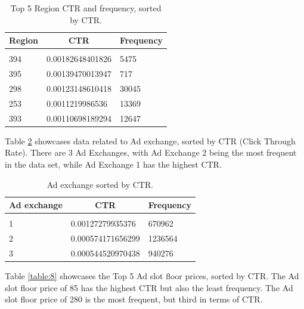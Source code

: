 \documentclass{article} %
\begin{document}
\begin{table}[!htbp]
\caption{Top 5 Region CTR and frequency, sorted by CTR.}
\label{table:6}
\begin{center}
\begin{tabular}{l l l}
\multicolumn{1}{c}{\bf Region} & \multicolumn{1}{c}{\bf CTR} & \multicolumn{1}{c}{\bf Frequency}
\\ \hline \\
394 & 0.00182648401826 & 5475\\
395 & 0.00139470013947 & 717\\
298 & 0.00123148610418 & 30045\\
253 & 0.0011219986536  & 13369\\
393 & 0.00110698189294 & 12647\\
\end{tabular}
\end{center}
\end{table}

Table \ref{table:7} showcases data related to Ad exchange, sorted by CTR (Click Through Rate). There are 3 Ad Exchanges, with Ad Exchange 2 being the most frequent in the data set, while Ad Exchange 1 has the highest CTR.

\begin{table}[!htbp]
\caption{Ad exchange sorted by CTR.}
\label{table:7}
\begin{center}
\begin{tabular}{l l l}
\multicolumn{1}{c}{\bf Ad exchange} & \multicolumn{1}{c}{\bf CTR} & \multicolumn{1}{c}{\bf Frequency}
\\ \hline \\
1 & 0.00127279935376  & 670962\\
2 & 0.000574171656299 & 1236564\\
3 & 0.000544520970438 & 940276\\
\end{tabular}
\end{center}
\end{table}

Table \ref{table:8} showcases the Top 5 Ad slot floor prices, sorted by CTR. The Ad slot floor price of 85 has the highest CTR but also the least frequency. The Ad slot floor price of 280 is the most frequent, but third in terms of CTR.
\end{document}
